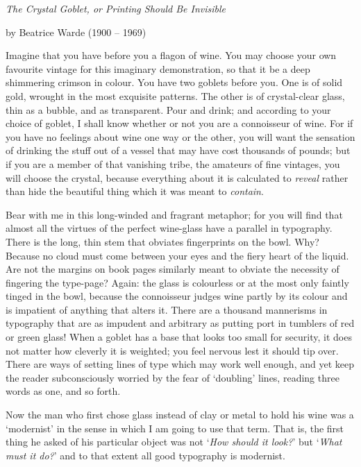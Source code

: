 \documentclass[12pt]{article}
\begin{document}
\thispagestyle{empty}
\noindent
\centerline{\em The Crystal Goblet, or Printing Should Be Invisible}
\medskip
\centerline{by Beatrice Warde (1900 -- 1969)}


\medskip

\noindent
Imagine that you have before you a flagon of wine. You may choose your own favourite vintage for this imaginary demonstration, so that it be a deep shimmering crimson in colour. You have two goblets before you. One is of solid gold, wrought in the most exquisite patterns. The other is of crystal-clear glass, thin as a bubble, and as transparent. Pour and drink; and according to your choice of goblet, I shall know whether or not you are a connoisseur of wine. For if you have no feelings about wine one way or the other, you will want the sensation of drinking the stuff out of a vessel that may have cost thousands of pounds; but if you are a member of that vanishing tribe, the amateurs of fine vintages, you will choose the crystal, because everything about it is calculated to \emph{reveal} rather than hide the beautiful thing which it was meant to \emph{contain}.

Bear with me in this long-winded and fragrant metaphor; for you will find that almost all the virtues of the perfect wine-glass have a parallel in typography. There is the long, thin stem that obviates fingerprints on the bowl. Why? Because no cloud must come between your eyes and the fiery heart of the liquid. Are not the margins on book pages similarly meant to obviate the necessity of fingering the type-page? Again: the glass is colourless or at the most only faintly tinged in the bowl, because the connoisseur judges wine partly by its colour and is impatient of anything that alters it. There are a thousand mannerisms in typography that are as impudent and arbitrary as putting port in tumblers of red or green glass! When a goblet has a base that looks too small for security, it does not matter how cleverly it is weighted; you feel nervous lest it should tip over. There are ways of setting lines of type which may work well enough, and yet keep the reader subconsciously worried by the fear of `doubling' lines, reading three words as one, and so forth.

Now the man who first chose glass instead of clay or metal to hold his wine was a `modernist' in the sense in which I am going to use that term. That is, the first thing he asked of his particular object was not `\emph{How should it look?}' but `\emph{What must it do?}' and to that extent all good typography is modernist.
\end{document}
